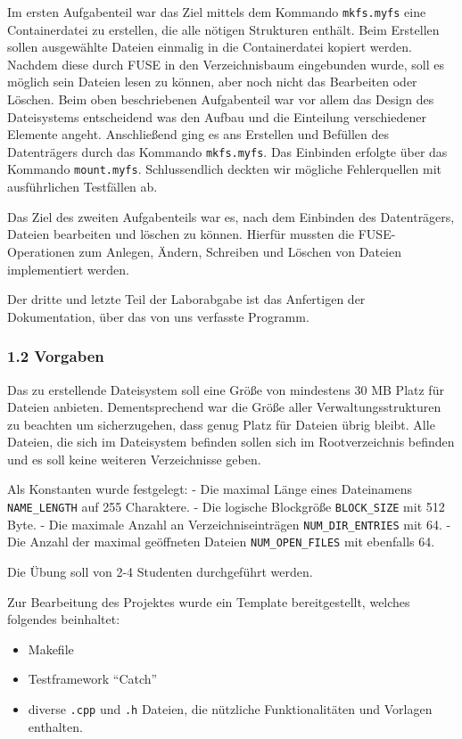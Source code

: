 \documentclass[]{article}
\providecommand{\tightlist}{%
  \setlength{\itemsep}{0pt}\setlength{\parskip}{0pt}}
\begin{document}
Im ersten Aufgabenteil war das Ziel mittels dem Kommando
\texttt{mkfs.myfs} eine Containerdatei zu erstellen, die alle nötigen
Strukturen enthält. Beim Erstellen sollen ausgewählte Dateien einmalig
in die Containerdatei kopiert werden. Nachdem diese durch FUSE in den
Verzeichnisbaum eingebunden wurde, soll es möglich sein Dateien lesen zu
können, aber noch nicht das Bearbeiten oder Löschen. Beim oben
beschriebenen Aufgabenteil war vor allem das Design des Dateisystems
entscheidend was den Aufbau und die Einteilung verschiedener Elemente
angeht. Anschließend ging es ans Erstellen und Befüllen des Datenträgers
durch das Kommando \texttt{mkfs.myfs}. Das Einbinden erfolgte über das
Kommando \texttt{mount.myfs}. Schlussendlich deckten wir mögliche
Fehlerquellen mit ausführlichen Testfällen ab.

Das Ziel des zweiten Aufgabenteils war es, nach dem Einbinden des
Datenträgers, Dateien bearbeiten und löschen zu können. Hierfür mussten
die FUSE-Operationen zum Anlegen, Ändern, Schreiben und Löschen von
Dateien implementiert werden.

Der dritte und letzte Teil der Laborabgabe ist das Anfertigen der
Dokumentation, über das von uns verfasste Programm.

\hypertarget{vorgaben}{%
\subsubsection{1.2 Vorgaben}\label{vorgaben}}

Das zu erstellende Dateisystem soll eine Größe von mindestens 30 MB
Platz für Dateien anbieten. Dementsprechend war die Größe aller
Verwaltungsstrukturen zu beachten um sicherzugehen, dass genug Platz für
Dateien übrig bleibt. Alle Dateien, die sich im Dateisystem befinden
sollen sich im Rootverzeichnis befinden und es soll keine weiteren
Verzeichnisse geben.

Als Konstanten wurde festgelegt: - Die maximal Länge eines Dateinamens
\texttt{NAME\_LENGTH} auf 255 Charaktere. - Die logische Blockgröße
\texttt{BLOCK\_SIZE} mit 512 Byte. - Die maximale Anzahl an
Verzeichniseinträgen \texttt{NUM\_DIR\_ENTRIES} mit 64. - Die Anzahl der
maximal geöffneten Dateien \texttt{NUM\_OPEN\_FILES} mit ebenfalls 64.

Die Übung soll von 2-4 Studenten durchgeführt werden.

Zur Bearbeitung des Projektes wurde ein Template bereitgestellt, welches
folgendes beinhaltet:

\begin{itemize}
\tightlist
\item
  Makefile
\item
  Testframework ``Catch''
\item
  diverse \texttt{.cpp} und \texttt{.h} Dateien, die nützliche
  Funktionalitäten und Vorlagen enthalten.
\end{itemize}
\end{document}
